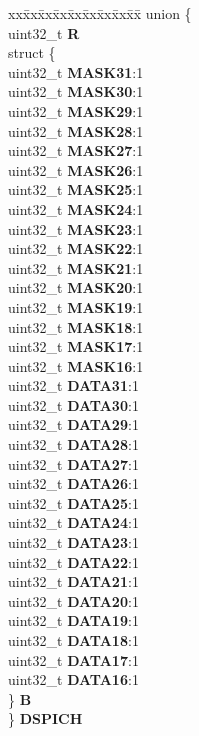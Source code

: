 \begin{DoxyCompactItemize}
\begin{tabbing}
\end{tabbing}\item 
\mbox{\label{structSIU__tag_af4349a73766d29c6c1c98bf129b04660}} 
\begin{tabbing}
xx\=xx\=xx\=xx\=xx\=xx\=xx\=xx\=xx\=\kill
union \{\\
\>uint32\_t {\bfseries R}\\
\>struct \{\\
\>\>uint32\_t {\bfseries MASK31}:1\\
\>\>uint32\_t {\bfseries MASK30}:1\\
\>\>uint32\_t {\bfseries MASK29}:1\\
\>\>uint32\_t {\bfseries MASK28}:1\\
\>\>uint32\_t {\bfseries MASK27}:1\\
\>\>uint32\_t {\bfseries MASK26}:1\\
\>\>uint32\_t {\bfseries MASK25}:1\\
\>\>uint32\_t {\bfseries MASK24}:1\\
\>\>uint32\_t {\bfseries MASK23}:1\\
\>\>uint32\_t {\bfseries MASK22}:1\\
\>\>uint32\_t {\bfseries MASK21}:1\\
\>\>uint32\_t {\bfseries MASK20}:1\\
\>\>uint32\_t {\bfseries MASK19}:1\\
\>\>uint32\_t {\bfseries MASK18}:1\\
\>\>uint32\_t {\bfseries MASK17}:1\\
\>\>uint32\_t {\bfseries MASK16}:1\\
\>\>uint32\_t {\bfseries DATA31}:1\\
\>\>uint32\_t {\bfseries DATA30}:1\\
\>\>uint32\_t {\bfseries DATA29}:1\\
\>\>uint32\_t {\bfseries DATA28}:1\\
\>\>uint32\_t {\bfseries DATA27}:1\\
\>\>uint32\_t {\bfseries DATA26}:1\\
\>\>uint32\_t {\bfseries DATA25}:1\\
\>\>uint32\_t {\bfseries DATA24}:1\\
\>\>uint32\_t {\bfseries DATA23}:1\\
\>\>uint32\_t {\bfseries DATA22}:1\\
\>\>uint32\_t {\bfseries DATA21}:1\\
\>\>uint32\_t {\bfseries DATA20}:1\\
\>\>uint32\_t {\bfseries DATA19}:1\\
\>\>uint32\_t {\bfseries DATA18}:1\\
\>\>uint32\_t {\bfseries DATA17}:1\\
\>\>uint32\_t {\bfseries DATA16}:1\\
\>\} {\bfseries B}\\
\} {\bfseries DSPICH}\\


\end{tabbing}
\end{DoxyCompactItemize}
